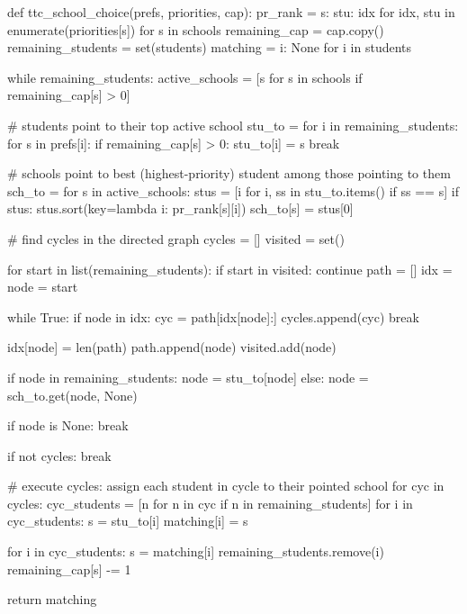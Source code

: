def ttc_school_choice(prefs, priorities, cap):
    pr_rank = {s: {stu: idx for idx, stu in enumerate(priorities[s])} for s in schools}
    remaining_cap = cap.copy()
    remaining_students = set(students)
    matching = {i: None for i in students}

    while remaining_students:
        active_schools = [s for s in schools if remaining_cap[s] > 0]

        # students point to their top active school
        stu_to = {}
        for i in remaining_students:
            for s in prefs[i]:
                if remaining_cap[s] > 0:
                    stu_to[i] = s
                    break

        # schools point to best (highest-priority) student among those pointing to them
        sch_to = {}
        for s in active_schools:
            stus = [i for i, ss in stu_to.items() if ss == s]
            if stus:
                stus.sort(key=lambda i: pr_rank[s][i])
                sch_to[s] = stus[0]

        # find cycles in the directed graph
        cycles = []
        visited = set()

        for start in list(remaining_students):
            if start in visited:
                continue
            path = []
            idx = {}
            node = start

            while True:
                if node in idx:
                    cyc = path[idx[node]:]
                    cycles.append(cyc)
                    break

                idx[node] = len(path)
                path.append(node)
                visited.add(node)

                if node in remaining_students:
                    node = stu_to[node]
                else:
                    node = sch_to.get(node, None)

                if node is None:
                    break

        if not cycles:
            break

        # execute cycles: assign each student in cycle to their pointed school
        for cyc in cycles:
            cyc_students = [n for n in cyc if n in remaining_students]
            for i in cyc_students:
                s = stu_to[i]
                matching[i] = s

            for i in cyc_students:
                s = matching[i]
                remaining_students.remove(i)
                remaining_cap[s] -= 1

    return matching
